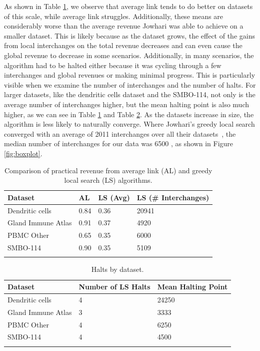 \documentclass[unnumsec,webpdf,contemporary,large,numbered]{oup-authoring-template}%
\theoremstyle{thmstyleone}%
\theoremstyle{thmstyletwo}%
\theoremstyle{thmstylethree}%
\begin{document}
As shown in Table \ref{table:results1}, we observe that average link tends to do better on datasets of this scale, while average link struggles. Additionally, these means are considerably worse than the average revenue Jowhari was able to achieve on a smaller dataset.\cite{jowhari2024hierarchicalclusteringlocalsearch} This is likely because as the dataset grows, the effect of the gains from local interchanges on the total revenue decreases and can even cause the global revenue to decrease in some scenarios. Additionally, in many scenarios, the algorithm had to be halted either because it was cycling through a few interchanges and global revenues or making minimal progress. This is particularly visible when we examine the number of interchanges and the number of halts. For larger datasets, like the dendritic cells dataset and the SMBO-114, not only is the average number of interchanges higher, but the mean halting point is also much higher, as we can see in Table \ref{table:results1} and Table \ref{table:halts}. As the datasets increase in size, the algorithm is less likely to naturally  converge. Where Jowhari's greedy local search converged with an average of 2011 interchanges over all their datasets~\cite{jowhari2024hierarchicalclusteringlocalsearch}, the median number of interchanges for our data was 6500 , as shown in Figure \ref{fig:boxplot}.

\begin{table}[t]
\begin{center}
\caption{Comparison of practical revenue from average link (AL) and greedy local search (LS) algorithms.   \label{table:results1}}%
\begin{tabular}{@{}llll@{}}
\toprule
Dataset & AL & LS (Avg) & LS (\# Interchanges) \\
\midrule
Dendritic cells & 0.84 & 0.36 & 20941 \\
Gland Immune Atlas & 0.91  & 0.37 & 4920 \\
PBMC Other & 0.65 & 0.35 & 6000 \\
SMBO-114 & 0.90  & 0.35 & 5109 \\
\botrule
\end{tabular}
\end{center}
\end{table}

\begin{table}[t]
\begin{center}
\caption{Halts by dataset. \label{table:halts}}%
\begin{tabular}{@{}lll@{}}
\toprule
Dataset & Number of LS Halts & Mean Halting Point \\
\midrule
Dendritic cells & 4 & 24250\\
Gland Immune Atlas & 3  & 3333 \\
PBMC Other & 4 & 6250 \\
SMBO-114 & 4 & 4500 \\
\botrule
\end{tabular}
\end{center}
\end{table}
\end{document}

